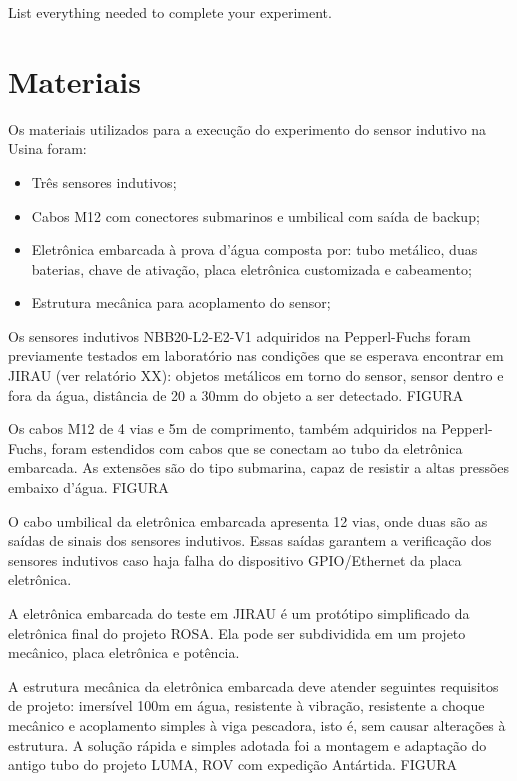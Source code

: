 
List everything needed to complete your experiment.



\section{Materiais}
Os materiais utilizados para a execução do experimento do sensor indutivo na
Usina foram:
\begin{itemize}
  \item Três sensores indutivos;
  \item Cabos M12 com conectores submarinos e umbilical com saída de backup;
  \item Eletrônica embarcada à prova d'água composta por: tubo metálico, duas
  baterias, chave de ativação, placa eletrônica customizada e cabeamento;
  \item Estrutura mecânica para acoplamento do sensor;
\end{itemize}
Os sensores indutivos NBB20-L2-E2-V1 adquiridos na Pepperl-Fuchs foram
previamente testados em laboratório nas condições que se esperava encontrar em JIRAU (ver relatório XX): objetos
metálicos em torno do sensor, sensor dentro e fora da água, distância de 20 a
30mm do objeto a ser detectado. FIGURA

Os cabos M12 de 4 vias e 5m de comprimento, também adquiridos na Pepperl-Fuchs,
foram estendidos com cabos que se conectam ao tubo da eletrônica embarcada. As
extensões são do tipo submarina, capaz de resistir a altas pressões embaixo
d'água. FIGURA

O cabo umbilical da eletrônica embarcada apresenta 12 vias, onde duas são as
saídas de sinais dos sensores indutivos. Essas saídas garantem a
verificação dos sensores indutivos caso haja falha do dispositivo GPIO/Ethernet
da placa eletrônica.

A eletrônica embarcada do teste em JIRAU é um protótipo simplificado da
eletrônica final do projeto ROSA. Ela pode ser subdividida em um projeto
mecânico, placa eletrônica e potência. 

A estrutura mecânica da eletrônica embarcada deve atender seguintes requisitos
de projeto: imersível 100m em água, resistente à vibração, resistente a choque
mecânico e acoplamento simples à viga pescadora, isto é, sem causar alterações à
estrutura. A solução rápida e simples adotada foi a montagem e adaptação do
antigo tubo do projeto LUMA, ROV com expedição Antártida. FIGURA

